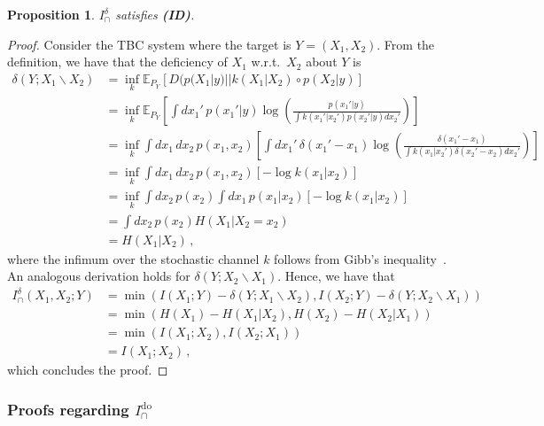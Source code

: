 \documentclass{article}
\newcommand{\ID}{\textbf{(ID)}\xspace} %
\newcommand{\Ido}{\ensuremath{I_\cap^{\text{do}}}\xspace}
\newcommand{\Idelta}{\ensuremath{I_\cap^{\delta}}\xspace}
\newcommand{\Ideltas}{\ensuremath{I_\cap^{\delta}(X_1,X_2;Y)}\xspace}
\newtheorem{proposition}{Proposition}
\begin{document}
\begin{proposition} \label{prop:Delta-ID}
    $\Idelta$ satisfies \ID.
\end{proposition}
\begin{proof}
    Consider the TBC system where the target is $Y=(X_1,X_2)$. From the definition, we have that the deficiency of $X_1$ w.r.t.\ $X_2$ about $Y$ is
    \begin{equation}
    \begin{aligned}
        \delta(Y;X_1\backslash X_2) & = \inf_k \mathbb{E}_{P_Y} \left[ D(p(X_1|y) ||k(X_1|X_2)\circ p(X_2|y)\right] \\
        & = \inf_k \mathbb{E}_{P_Y} \left[ \int dx_1'\, p(x_1'|y) \log \left(\frac{p(x_1'|y)}{\int k(x_1'|x_2')p(x_2'|y) dx_2'} \right)\right] \\
        & = \inf_k \int dx_1\, dx_2\, p(x_1,x_2) \left[ \int dx_1'\, \delta(x_1'-x_1) \log \left(\frac{\delta(x_1'-x_1)}{\int k(x_1|x_2')\delta(x_2'-x_2) dx_2'} \right)\right] \\
        & = \inf_k \int dx_1\, dx_2\, p(x_1,x_2) \left[ - \log k(x_1|x_2) \right] \\
        & = \inf_k \int dx_2\, p(x_2) \int dx_1\, p(x_1|x_2) \left[ - \log k(x_1|x_2) \right] \\
        & = \int dx_2\, p(x_2) H(X_1|X_2=x_2) \\
        & = H(X_1|X_2) \,,
    \end{aligned}
    \end{equation}
    where the infimum over the stochastic channel $k$ follows from Gibb's inequality~\cite{cover1999elements}. An analogous derivation holds for $\delta(Y;X_2\backslash X_1)$. 
    Hence, we have that
    \begin{equation}
    \begin{aligned}
        \Ideltas & = \min \left(I(X_1;Y)-\delta(Y;X_1\backslash X_2), I(X_2;Y)-\delta(Y;X_2\backslash X_1)\right) \\
        & = \min \left(H(X_1)- H(X_1|X_2), H(X_2)- H(X_2|X_1)\right) \\
        & = \min \left(I(X_1;X_2), I(X_2;X_1)\right) \\
        & = I(X_1;X_2) \,,
    \end{aligned}
    \end{equation}
    which concludes the proof.
\end{proof}


\subsubsection{Proofs regarding \Ido}
\end{document}
